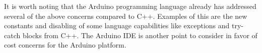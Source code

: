 It is worth noting that the Arduino programming language already has addressed several of the above concerns compared to C++. Examples of this are the new constants and disabling of some language capabilities like exceptions and try-catch blocks from C++. The Arduino IDE is another point to consider in favor of cost concerns for the Arduino platform.
